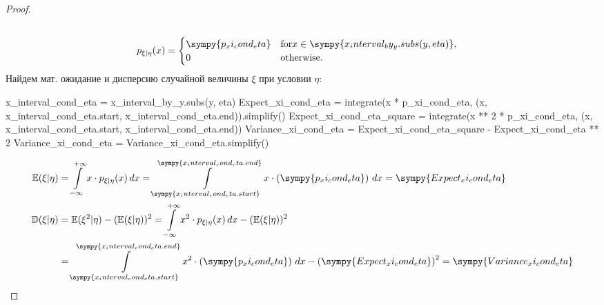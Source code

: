 \begin{proof}
\[\begin{aligned}
            \\
            p_{\xi|\eta} (x)
             & = \begin{cases}
                     \sympy{p_xi_cond_eta} & \text{for} x \in \sympy{x_interval_by_y.subs(y, eta)}, \\
                     0                     & \text{otherwise}.
                 \end{cases}
        \end{aligned}
    \]
    Найдем мат. ожидание и дисперсию случайной величины $\xi$ при условии $\eta$:
    \begin{sympycode}
x_interval_cond_eta = x_interval_by_y.subs(y, eta)
Expect_xi_cond_eta = integrate(x * p_xi_cond_eta, (x, x_interval_cond_eta.start, x_interval_cond_eta.end)).simplify()
Expect_xi_cond_eta_square = integrate(x ** 2 * p_xi_cond_eta, (x, x_interval_cond_eta.start, x_interval_cond_eta.end))
Variance_xi_cond_eta = Expect_xi_cond_eta_square - Expect_xi_cond_eta ** 2
Variance_xi_cond_eta = Variance_xi_cond_eta.simplify()
    \end{sympycode}
    \[
        \begin{aligned}
            \Expect(\xi|\eta)
             & = \int\limits_{-\infty}^{+\infty} x \cdot p_{\xi|\eta} (x) \, dx
            = \int\limits_{\sympy{x_interval_cond_eta.start}}^{\sympy{x_interval_cond_eta.end}} x \cdot \left(\sympy{p_xi_cond_eta}\right) \, dx
            = \sympy{Expect_xi_cond_eta}
            \\
            \Variance(\xi|\eta)
             & = \Expect(\xi^2|\eta) - (\Expect(\xi|\eta))^2
            = \int\limits_{-\infty}^{+\infty} x^2 \cdot p_{\xi|\eta} (x) \, dx - (\Expect(\xi|\eta))^2
            \\
             & = \int\limits_{\sympy{x_interval_cond_eta.start}}^{\sympy{x_interval_cond_eta.end}} x^2 \cdot \left(\sympy{p_xi_cond_eta}\right) \, dx - \left(\sympy{Expect_xi_cond_eta}\right)^2
            = \sympy{Variance_xi_cond_eta}
        \end{aligned}
    \]
\end{proof}